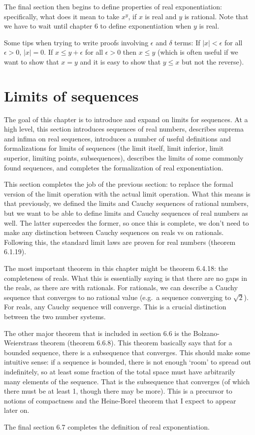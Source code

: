 \documentclass[answers,12pt]{exam}
\begin{document}
The final section then begins to define properties of real exponentiation:
specifically, what does it mean to take $x^y$, if $x$ is real and $y$ is rational.
Note that we have to wait until chapter 6 to define exponentiation when $y$ is real.

Some tips when trying to write proofs involving $\epsilon$ and $\delta$ terms:
If $|x|<\epsilon$ for all $\epsilon >0$, $|x| = 0$.
If $x \leq y + \epsilon$ for all $\epsilon > 0$ then $x \leq y$ (which is often useful if we want to show that $x=y$ and it is easy to show that $y \leq x$ but not the reverse).

\section{Limits of sequences}
The goal of this chapter is to introduce and expand on limits for sequences.
At a high level, this section introduces sequences of real numbers, describes suprema and infima on real sequences, introduces a number of useful definitions and formalizations for limits of sequences (the limit itself, limit inferior, limit superior, limiting points, subsequences), describes the limits of some commonly found sequences, and completes the formalization of real exponentiation.

This section completes the job of the previous section: to replace the formal version of the limit operation with the actual limit operation.
What this means is that previously, we defined the limits and Cauchy sequences of rational numbers, but we want to be able to define limits and Cauchy sequences of real numbers as well.
The latter supercedes the former, so once this is complete, we don't need to make any distinction between Cauchy sequences on reals vs on rationals.
Following this, the standard limit laws are proven for real numbers (theorem 6.1.19).

The most important theorem in this chapter might be theorem 6.4.18: the completeness of reals.
What this is essentially saying is that there are no gaps in the reals, as there are with rationals.
For rationals, we can describe a Cauchy sequence that converges to no rational value (e.g.\ a sequence converging to $\sqrt{2}$).
For reals, any Cauchy sequence will converge.
This is a crucial distinction between the two number systems.

The other major theorem that is included in section 6.6 is the Bolzano-Weierstrass theorem (theorem 6.6.8).
This theorem basically says that for a bounded sequence, there is a subsequence that converges.
This should make some intuitive sense: if a sequence is bounded, there is not enough `room' to spread out indefinitely, so at least some fraction of the total space must have arbitrarily many elements of the sequence.
That is the subsequence that converges (of which there must be at least 1, though there may be more).
This is a precursor to notions of compactness and the Heine-Borel theorem that I expect to appear later on.

The final section 6.7 completes the definition of real exponentiation.
\end{document}
